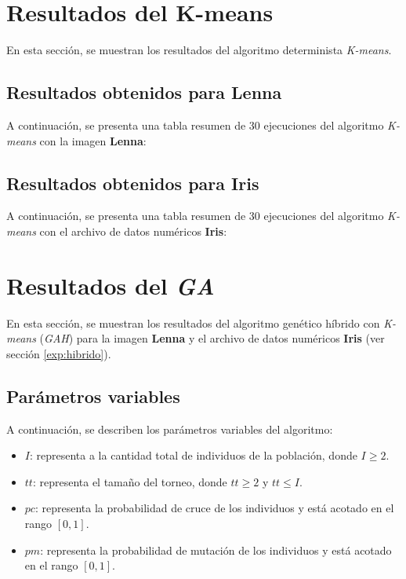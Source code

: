 \section{Resultados del K-means}

    En esta sección, se muestran los resultados del algoritmo determinista
\emph{K-means}.

\subsection{Resultados obtenidos para \textbf{Lenna}}

    A continuación, se presenta una tabla resumen de 30 ejecuciones del
algoritmo \emph{K-means} con la imagen \textbf{Lenna}:



\subsection{Resultados obtenidos para \textbf{Iris}}

    A continuación, se presenta una tabla resumen de 30 ejecuciones del
algoritmo \emph{K-means} con el archivo de datos numéricos \textbf{Iris}:



\section{Resultados del \emph{GA}}

    En esta sección, se muestran los resultados del algoritmo genético híbrido con
\emph{K-means} (\emph{GAH}) para la imagen \textbf{Lenna} y el archivo de datos
numéricos \textbf{Iris} (ver sección \ref{exp:hibrido}).

\subsection{Parámetros variables}\label{sect:iga-pv}

    A continuación, se describen los parámetros variables del algoritmo:
\begin{itemize}
    \item $I$: representa a la cantidad total de individuos de la población,
donde $I \geq 2$.
    \item $tt$: representa el tamaño del torneo, donde $tt \geq 2$ y $tt \leq I$.
    \item $pc$: representa la probabilidad de cruce de los individuos y
está acotado en el rango $[0, 1]$.
    \item $pm$: representa la probabilidad de mutación de los individuos y
está acotado en el rango $[0, 1]$.
\end{itemize}

